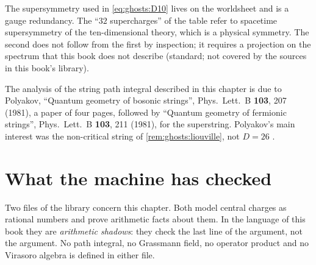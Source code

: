 \begin{pitfallbox}
The supersymmetry used in \cref{eq:ghosts:D10} lives on the worldsheet and is a gauge
redundancy. The ``$32$ supercharges'' of the table refer to spacetime supersymmetry of the
ten-dimensional theory, which is a physical symmetry. The second does not follow from the
first by inspection; it requires a projection on the spectrum that this book does not
describe (standard; not covered by the sources in this book's library).
\end{pitfallbox}

\begin{historybox}
The analysis of the string path integral described in this chapter is due to Polyakov,
``Quantum geometry of bosonic strings'', Phys.\ Lett.\ B \textbf{103}, 207 (1981), a paper of
four pages, followed by ``Quantum geometry of fermionic strings'', Phys.\ Lett.\ B
\textbf{103}, 211 (1981), for the superstring. Polyakov's main interest was the non-critical
string of \cref{rem:ghosts:liouville}, not $D=26$
.
\end{historybox}

\section{What the machine has checked}\label{sec:ghosts:lean}

Two files of the library  concern this chapter. Both model
central charges as rational numbers and prove arithmetic facts about them. In the language of
this book they are \emph{arithmetic shadows}: they check the last line of the argument, not
the argument. No path integral, no Grassmann field, no operator product and no Virasoro
algebra is defined in either file.

